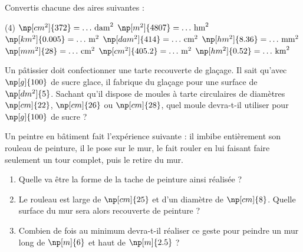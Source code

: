 \documentclass{classe-tex3R}
\begin{document}


\begin{enonce}
	Convertis chacune des aires suivantes :

	\begin{tasks}[style=enumerate](4)
		\task $\np[cm^2]{372} = \dots\,\text{dam}^2$
		\task $\np[m^2]{4807} = \dots\,\text{hm}^2$
		\task $\np[km^2]{0.005} = \dots\,\text{m}^2$
		\task $\np[dam^2]{414} = \dots\,\text{cm}^2$	
		\task $\np[hm^2]{8.36} = \dots\,\text{mm}^2$
		\task $\np[mm^2]{28} = \dots\,\text{cm}^2$
		\task $\np[cm^2]{405.2} = \dots\,\text{m}^2$
		\task $\np[hm^2]{0.52} = \dots\,\text{km}^2$
	\end{tasks}
\end{enonce}



\begin{enonce}
Un pâtissier doit confectionner une tarte recouverte de glaçage. Il sait qu'avec $\np[g]{100}$ de sucre glace, il fabrique du glaçage pour une surface de $\np[dm^2]{5}$. Sachant qu'il dispose de moules à tarte circulaires de diamètres $\np[cm]{22}$, $\np[cm]{26}$ ou $\np[cm]{28}$, quel moule devra-t-il utiliser pour $\np[g]{100}$ de sucre ?
\end{enonce}






\begin{enonce}
	Un peintre en bâtiment fait l'expérience suivante : il imbibe entièrement son rouleau de peinture, il le pose sur le mur, le fait rouler en lui faisant faire seulement un tour complet, puis le retire du mur.

	\begin{enumerate}
		\item Quelle va être la forme de la tache de peinture ainsi réalisée ?
		\item Le rouleau est large de $\np[cm]{25}$ et d'un diamètre de $\np[cm]{8}$. Quelle surface du mur sera alors recouverte de peinture ?
		\item Combien de fois au minimum devra-t-il réaliser ce geste pour peindre un mur long de $\np[m]{6}$ et haut de $\np[m]{2.5}$ ?
	\end{enumerate}
\end{enonce}
\end{document}
